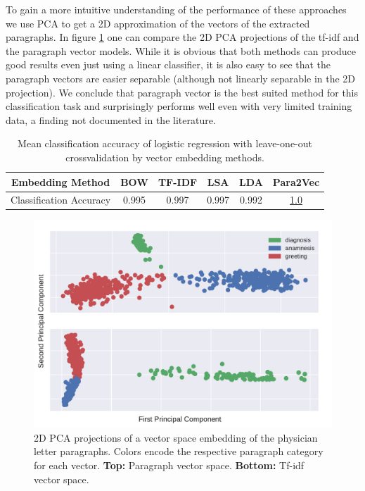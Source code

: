 To gain a more intuitive understanding of the performance of these approaches we use PCA to get a 2D approximation of the vectors of the extracted paragraphs. In figure \ref{fig:pv_tf_pca} one can compare the 2D PCA projections of the tf-idf and the paragraph vector models. While it is obvious that both methods can produce good results even just using a linear classifier, it is also easy to see that the paragraph vectors are easier separable (although not linearly separable in the 2D projection). We conclude that paragraph vector is the best suited method for this classification task and surprisingly performs well even with very limited training data, a finding not documented in the literature.
\begin{table}
\begin{tabular}{|c|c|c|c|c|c|}
	\hline 
	Embedding Method & BOW & TF-IDF & LSA & LDA  & Para2Vec\tabularnewline
	\hline 
	\hline 
	Classification Accuracy & 0.995 & 0.997 & 0.997 & 0.992 & \underline{1.0}\tabularnewline
	\hline 
\end{tabular}
	\caption{Mean classification accuracy of logistic regression with leave-one-out crossvalidation by vector embedding methods.}
	\label{table:para_class_acc}
\end{table}

\begin{figure}
	\includegraphics[width=\linewidth]{figures/para2vec_tfidf_pca}
	\caption{2D PCA projections of a vector space embedding of the physician letter paragraphs. Colors encode the respective paragraph category for each vector. \textbf{Top:} Paragraph vector space.  \textbf{Bottom:} Tf-idf vector space.}
	\label{fig:pv_tf_pca}
\end{figure}

